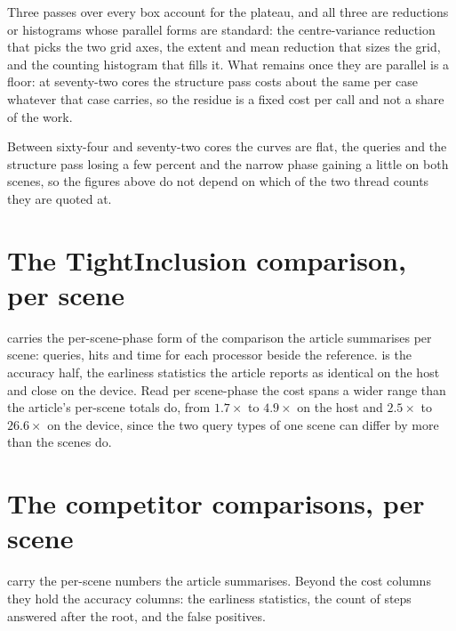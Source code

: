 Three passes over every box account for the plateau, and all three are
reductions or histograms whose parallel forms are standard: the centre-variance
reduction that picks the two grid axes, the extent and mean reduction that sizes
the grid, and the counting histogram that fills it. What remains once they are
parallel is a floor: at seventy-two cores the structure pass costs about the
same per case whatever that case carries, so the residue is a fixed cost per
call and not a share of the work.

Between sixty-four and seventy-two cores the curves are flat, the queries and
the structure pass losing a few percent and the narrow phase gaining a little on
both scenes, so the figures above do not depend on which of the two thread
counts they are quoted at.

\section{The TightInclusion comparison, per scene}
\label{sec:supp:reference}

 carries the per-scene-phase form of the comparison the
article summarises per scene: queries, hits and time for each processor beside
the reference.  is the accuracy half, the earliness
statistics the article reports as identical on the host and close on the device.
Read per scene-phase the cost spans a wider range than the article's per-scene
totals do, from $1.7\times$ to $4.9\times$ on the host and $2.5\times$ to
$26.6\times$ on the device, since the two query types of one scene can differ by
more than the scenes do.





\section{The competitor comparisons, per scene}
\label{sec:supp:competitors}

 carry the per-scene numbers
the article summarises. Beyond the cost columns they hold the accuracy columns:
the earliness statistics, the count of steps answered after the root, and the
false positives.





